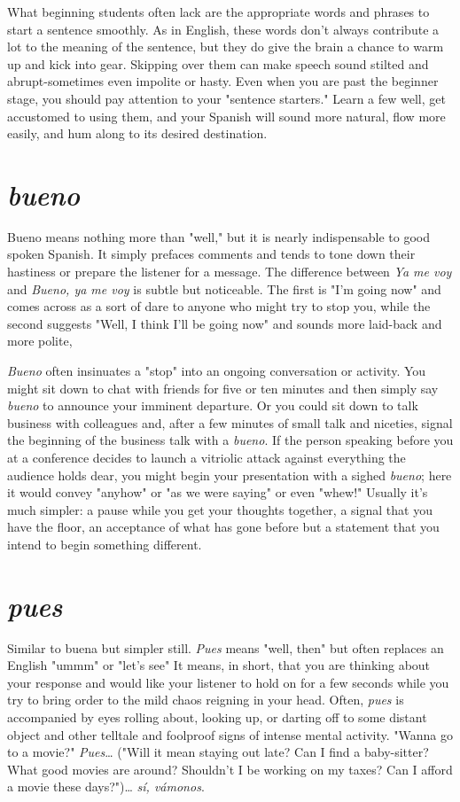 \documentclass[14pt,a4paper,oneside]{memoir}
\begin{document}
What beginning students often lack are the appropriate words
and phrases to start a sentence smoothly. As in English, these words
don't always contribute a lot to the meaning of the sentence, but they
do give the brain a chance to warm up and kick into gear. Skipping
over them can make speech sound stilted and abrupt-sometimes
even impolite or hasty. Even when you are past the beginner stage, you
should pay attention to your "sentence starters." Learn a few well, get
accustomed to using them, and your Spanish will sound more natural,
flow more easily, and hum along to its desired destination.

\section{\emph{bueno}}

Bueno means nothing more than "well," but it is nearly indispensable to good spoken Spanish. It simply prefaces comments and tends
to tone down their hastiness or prepare the listener for a message. The
difference between \emph{Ya me voy} and \emph{Bueno, ya me voy} is subtle but noticeable. The first is "I'm going now" and comes across as a sort of dare
to anyone who might try to stop you, while the second suggests "Well,
I think I'll be going now" and sounds more laid-back and more polite,

\emph{Bueno} often insinuates a "stop" into an ongoing conversation
or activity. You might sit down to chat with friends for five or ten minutes and then simply say \emph{bueno} to announce your imminent departure. Or you could sit down to talk business with colleagues and, after
a few minutes of small talk and niceties, signal the beginning of the
business talk with a \emph{bueno}. If the person speaking before you at a conference decides to launch a vitriolic attack against everything the audience holds dear, you might begin your presentation with a sighed
\emph{bueno}; here it would convey "anyhow" or "as we were saying" or
even "whew!" Usually it's much simpler: a pause while you get your
thoughts together, a signal that you have the floor, an acceptance of
what has gone before but a statement that you intend to begin something different.

\section{\emph{pues}}

Similar to buena but simpler still. \emph{Pues} means "well, then"
but often replaces an English "ummm" or "let's see" It means, in
short, that you are thinking about your response and would like your
listener to hold on for a few seconds while you try to bring order to the
mild chaos reigning in your head. Often, \emph{pues} is accompanied by eyes
rolling about, looking up, or darting off to some distant object and
other telltale and foolproof signs of intense mental activity. "Wanna
go to a movie?" \emph{Pues}\ldots{} ("Will it mean staying out late? Can I find a
baby-sitter? What good movies are around? Shouldn't I be working on
my taxes? Can I afford a movie these days?")\ldots{} \emph{sí, vámonos}.
\end{document}
